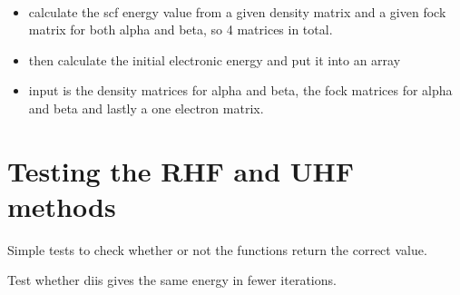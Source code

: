 \documentclass[letterpaper,10pt,english]{sphinxmanual}
\begin{document}
\begin{fulllineitems}
\label{\detokenize{SCF_functions:hf.SCF_functions.uhf_scf_energy}}~\begin{itemize}
\item {} 
calculate the scf energy value from a given density matrix and a given fock matrix for both alpha and beta,
so 4 matrices in total.

\item {} 
then calculate the initial electronic energy and put it into an array

\item {} 
input is the density matrices for alpha and beta, the fock matrices for alpha and beta and lastly a one electron
matrix.

\end{itemize}

\end{fulllineitems}

\label{\detokenize{tests:module-hf.tests.test_auth}}

\chapter{Testing the RHF and UHF methods}
\label{\detokenize{tests:testing-the-rhf-and-uhf-methods}}\label{\detokenize{tests::doc}}
Simple tests to check whether or not the functions return the correct value.

\begin{fulllineitems}
\label{\detokenize{tests:hf.tests.test_auth.test_diis_real_ghf}}
Test whether diis gives the same energy in fewer iterations.

\end{fulllineitems}

\end{document}
